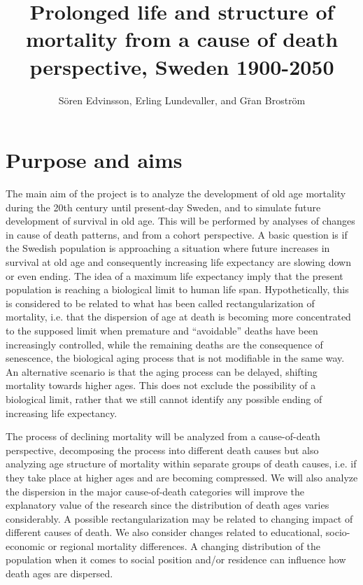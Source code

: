 \documentclass[a4paper,12pt]{article}
\author{S\"oren Edvinsson, Erling Lundevaller, and G\"ran Brostr\"om}
\title{Prolonged life and structure of mortality from a cause of death
  perspective, Sweden 1900-2050}
\begin{document}
\maketitle

\section{Purpose and aims}

The main aim of the project is to analyze the development of old age
mortality during the 20th century until present-day Sweden, and to simulate
future development of survival in old age. This will be performed by
analyses of changes in cause of death patterns, and from a cohort
perspective. A basic question is if the Swedish population is approaching a
situation where future increases in survival at old age and consequently
increasing life expectancy are slowing down or even ending. The idea of a
maximum life expectancy imply that the present population is reaching a
biological limit to human life span. Hypothetically, this is considered to
be related to what has been called rectangularization of mortality,
i.e. that the dispersion of age at death is becoming more concentrated to
the supposed limit when premature and “avoidable” deaths have been
increasingly controlled, while the remaining deaths are the consequence of
senescence, the biological aging process that is not modifiable in the same
way. An alternative scenario is that the aging process can be delayed,
shifting mortality towards higher ages. This does not exclude the
possibility of a biological limit, rather that we still cannot identify any
possible ending of increasing life expectancy. 

The process of declining mortality will be analyzed from a cause-of-death
perspective, decomposing the process into different death causes but also
analyzing age structure of mortality within separate groups of death
causes, i.e. if they take place at higher ages and are becoming
compressed. We will also analyze the dispersion in the major cause-of-death
categories will improve the explanatory value of the research since the
distribution of death ages varies considerably. A possible
rectangularization may be related to changing impact of different causes of
death. We also consider changes related to educational, socio-economic or
regional mortality differences. A changing distribution of the population
when it comes to social position and/or residence can influence how death
ages are dispersed. 
\end{document}
